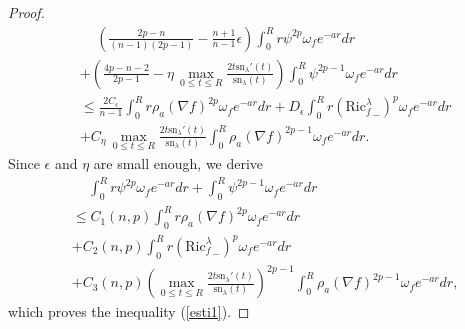 \documentclass[10pt,a4paper]{amsart}
\newcommand{\sn}{\mathrm{sn}}
\begin{document}
\begin{proof}
\begin{equation*}
		\begin{aligned}
			&\quad\,\left(\frac{2p-n}{(n-1)(2p-1)}-\frac{n+1}{n-1}\epsilon\right)\int_{0}^{R}r\psi^{2p}\omega_fe^{-ar}dr\\
			&+\left(\frac{4p-n-2}{2p-1}-\eta\,\max_{0\leq t\leq R}\frac{2t\sn_\lambda'(t)}{\sn_\lambda(t)}\right)\int_0^R\psi^{2p-1}\omega_fe^{-ar}dr\\
			&\leq \frac{2C_\epsilon}{n-1}\int_{0}^Rr\rho_a(\nabla f)^{2p}\omega_fe^{-ar}dr+D_\epsilon\int_{0}^Rr\left({\mathrm{Ric}^\lambda_f}_-\right)^p\omega_fe^{-ar}dr\\
			&+C_\eta\,\max_{0\leq t\leq R}\frac{2t\sn_\lambda'(t)}{\sn_\lambda(t)}\int_{0}^R\rho_a(\nabla f)^{2p-1}\omega_fe^{-ar}dr.
		\end{aligned}
	\end{equation*}
	Since $\epsilon$ and $\eta$ are small enough, we derive
	\begin{equation*}
		\begin{aligned}
			&\quad\,\int_{0}^{R}r\psi^{2p}\omega_fe^{-ar}dr+\int_0^R\psi^{2p-1}\omega_fe^{-ar}dr\\
			&\leq C_1(n,p)\int_{0}^Rr\rho_a(\nabla f)^{2p}\omega_fe^{-ar}dr\\
			&+C_2(n,p)\int_{0}^Rr\left({\mathrm{Ric}^\lambda_f}_-\right)^p\omega_fe^{-ar}dr\\
			&+C_3(n,p)\left(\max_{0\leq t\leq R}\frac{2t\sn_\lambda'(t)}{\sn_\lambda(t)}\right)^{2p-1}\int_{0}^R\rho_a(\nabla f)^{2p-1}\omega_fe^{-ar}dr,
		\end{aligned}
	\end{equation*}
	which proves the inequality (\ref{esti1}).
\end{proof}
\end{document}
